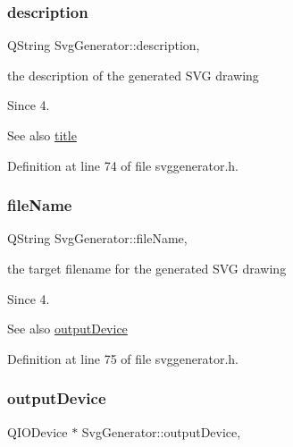 \subsubsection{\texorpdfstring{description}{description}}
{\footnotesize\ttfamily Q\+String Svg\+Generator\+::description\hspace{0.3cm}{\ttfamily [read]}, {\ttfamily [write]}}



the description of the generated S\+VG drawing 

\begin{DoxySince}{Since}
4. 
\end{DoxySince}
\begin{DoxySeeAlso}{See also}
\hyperlink{class_svg_generator_abe9c2cd9446061e16cfdea2fa7eb777d}{title} 
\end{DoxySeeAlso}


Definition at line 74 of file svggenerator.\+h.

\mbox{\label{class_svg_generator_a4f72398a28e315c9192a611e16f8b693}} 
\subsubsection{\texorpdfstring{file\+Name}{fileName}}
{\footnotesize\ttfamily Q\+String Svg\+Generator\+::file\+Name\hspace{0.3cm}{\ttfamily [read]}, {\ttfamily [write]}}



the target filename for the generated S\+VG drawing 

\begin{DoxySince}{Since}
4.
\end{DoxySince}
\begin{DoxySeeAlso}{See also}
\hyperlink{class_svg_generator_aa03e26c21b02f54f2e318633db8496de}{output\+Device} 
\end{DoxySeeAlso}


Definition at line 75 of file svggenerator.\+h.

\mbox{\label{class_svg_generator_aa03e26c21b02f54f2e318633db8496de}} 
\subsubsection{\texorpdfstring{output\+Device}{outputDevice}}
{\footnotesize\ttfamily Q\+I\+O\+Device $\ast$ Svg\+Generator\+::output\+Device\hspace{0.3cm}{\ttfamily [read]}, {\ttfamily [write]}}



